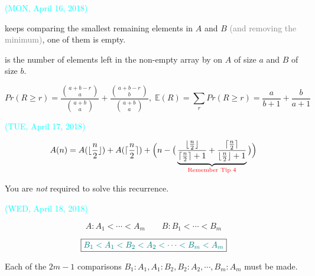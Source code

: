 \begin{frame}{}
  {\vspace{-0.30cm} \centerline{\textcolor{cyan}{\small (MON, April 16, 2018)}}}

  \vspace{0.50cm}
   keeps comparing the smallest remaining elements in $A$ and $B$
  {\small \textcolor{gray}{(and removing the minimum)}},  one of them is empty.

  \begin{definition}[$R$]
     is the number of elements left in the non-empty array by 
    on $A$ of size $a$ and $B$ of size $b$.
  \end{definition}

  \begin{theorem}
    \vspace{-0.50cm}
    \[
      Pr(R \ge r) = \frac{\binom{a + b - r}{a}}{\binom{a + b}{a}} + \frac{\binom{a + b - r}{b}}{\binom{a + b}{a}},
      \; \mathbb{E}(R) = \sum_{r} Pr(R \ge r) = \frac{a}{b+1} + \frac{b}{a+1}
    \]
  \end{theorem}
\end{frame}

\begin{frame}{}
  {\vspace{-0.50cm} \centerline{\textcolor{cyan}{\small (TUE, April 17, 2018)}}}

  \vspace{0.50cm}
  \[
    A(n) = A(\lfloor \frac{n}{2} \rfloor) + A(\lceil \frac{n}{2} \rceil) + 
    \Big(n - \big(\underbrace{\frac{\lfloor \frac{n}{2} \rfloor}{\lceil \frac{n}{2} \rceil + 1} 
    + \frac{\lceil \frac{n}{2} \rceil}{\lfloor \frac{n}{2} \rfloor + 1}}_{\text{\textcolor{red}{Remember Tip $4$}}}\big)\Big)
  \]

  \vspace{0.80cm}
  \centerline{You are {\it not} required to solve this recurrence.}
\end{frame}

\begin{frame}{}
  {\vspace{-0.50cm} \centerline{\textcolor{cyan}{\small (WED, April 18, 2018)}}}

  \[
    A: A_1 < \cdots < A_m \qquad B: B_1 < \cdots < B_m
  \]

  \[
    \boxed{\textcolor{teal}{B_1 < A_1 < B_2 < A_2 < \cdots < B_m < A_m}}
  \]

  \begin{theorem}
    Each of the $2m-1$ comparisons $B_1 : A_1, A_1 : B_2, B_2 : A_2, \cdots, B_m : A_m$ must be made.
  \end{theorem}
\end{frame}

